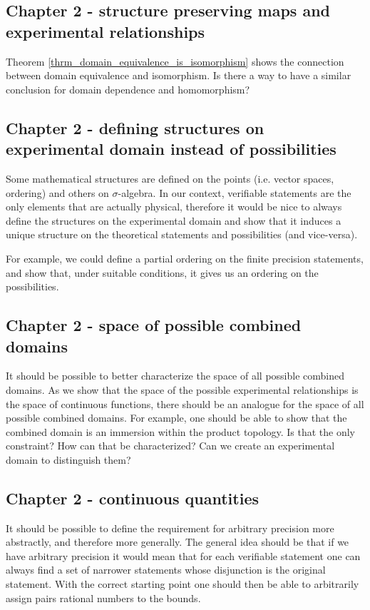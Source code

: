 \documentclass[11pt,letterpaper,fleqn]{memoir} %
\begin{document}
\subsection{Chapter 2 - structure preserving maps and experimental relationships}

Theorem \ref{thrm_domain_equivalence_is_isomorphism} shows the connection between domain equivalence and isomorphism. Is there a way to have a similar conclusion for domain dependence and homomorphism?

\subsection{Chapter 2 - defining structures on experimental domain instead of possibilities}

Some mathematical structures are defined on the points (i.e. vector spaces, ordering) and others on $\sigma$-algebra. In our context, verifiable statements are the only elements that are actually physical, therefore it would be nice to always define the structures on the experimental domain and show that it induces a unique structure on the theoretical statements and possibilities (and vice-versa).

For example, we could define a partial ordering on the finite precision statements, and show that, under suitable conditions, it gives us an ordering on the possibilities.

\subsection{Chapter 2 - space of possible combined domains}

It should be possible to better characterize the space of all possible combined domains. As we show that the space of the possible experimental relationships is the space of continuous functions, there should be an analogue for the space of all possible combined domains. For example, one should be able to show that the combined domain is an immersion within the product topology. Is that the only constraint? How can that be characterized? Can we create an experimental domain to distinguish them?

\subsection{Chapter 2 - continuous quantities}

It should be possible to define the requirement for arbitrary precision more abstractly, and therefore more generally. The general idea should be that if we have arbitrary precision it would mean that for each verifiable statement one can always find a set of narrower statements whose disjunction is the original statement. With the correct starting point one should then be able to arbitrarily assign pairs rational numbers to the bounds.
\end{document}
